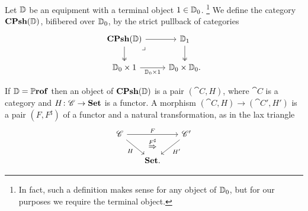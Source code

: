 \documentclass[11pt,oneside,article]{memoir}
\begin{document}
\begin{definition}
      \label{def:copresheaves}
   Let $\mathbb{D}$ be an equipment with a terminal object $1\in\mathbb{D}_0$.%
   \footnote{In fact, such a definition makes sense for any object of $\mathbb{D}_0$, but for our
   purposes we require the terminal object.}
   We define the category $\mathbf{CPsh}(\mathbb{D})$, bifibered over
   $\mathbb{D}_0$, by the strict pullback of categories
   \begin{equation*}
     \begin{tikzcd}
         \CPsh(\dcat{D}) \ar[r] \ar[d,two heads] \arrow[dr,phantom,"\lrcorner",very near start]
            & \dcat{D}_1 \ar[d,two heads] \\
         \dcat{D}_0\times 1 \ar[r,"\dcat{D}_0\times 1"']
            & \dcat{D}_0\times\dcat{D}_0.
      \end{tikzcd}
   \end{equation*}
\end{definition}

\begin{example}
If $\mathbb{D}=\mathbb{P}\mathbf{rof}$ then an object of $\mathbf{CPsh}(\mathbb{D})$ is a pair $(\cat{C},H)$, where $\cat{C}$ is a category
and $H\colon \mathscr{C}\to\mathbf{Set}$ is a functor. A morphism $(\cat{C},H)\to(\cat{C}',H')$ is a pair $(F,F^\sharp)$ of a
functor and a natural transformation, as in the lax triangle
\[ \begin{tikzcd}[column sep=.6cm]
   \cat{C}\ar[rr,"F"]\ar[rd,"H"']&\ar[d,phantom,"\overset{F^\sharp}{\Rightarrow}" near start]&\cat{C}'\ar[dl,"H'"]\\
   &\Set.
\end{tikzcd} \]
\end{example}
\end{document}
